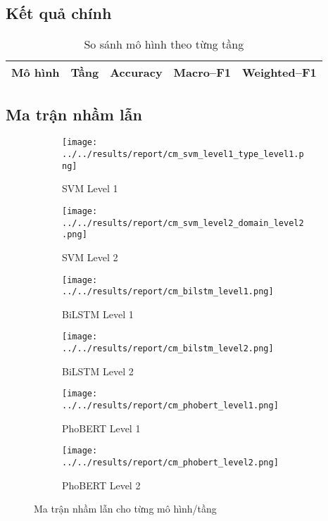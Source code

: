 \documentclass[12pt,a4paper]{article}
\begin{document}
\subsection{Kết quả chính}
\begin{table}[H]
  \centering
  \caption{So sánh mô hình theo từng tầng}
  \begin{tabular}{lllll}
    \toprule
    Mô hình & Tầng & Accuracy & Macro--F1 & Weighted--F1 \\
    \midrule
    \bottomrule
  \end{tabular}
\end{table}

\subsection{Ma trận nhầm lẫn}
\begin{figure}[H]
  \centering
  \begin{subfigure}[b]{0.49\linewidth}
    \centering
    \texttt{[image: ../../results/report/cm\_svm\_level1\_type\_level1.png]}
    \caption{SVM Level 1}
  \end{subfigure}
  \begin{subfigure}[b]{0.49\linewidth}
    \centering
    \texttt{[image: ../../results/report/cm\_svm\_level2\_domain\_level2.png]}
    \caption{SVM Level 2}
  \end{subfigure}
  \begin{subfigure}[b]{0.49\linewidth}
    \centering
    \texttt{[image: ../../results/report/cm\_bilstm\_level1.png]}
    \caption{BiLSTM Level 1}
  \end{subfigure}
  \begin{subfigure}[b]{0.49\linewidth}
    \centering
    \texttt{[image: ../../results/report/cm\_bilstm\_level2.png]}
    \caption{BiLSTM Level 2}
  \end{subfigure}
  \begin{subfigure}[b]{0.49\linewidth}
    \centering
    \texttt{[image: ../../results/report/cm\_phobert\_level1.png]}
    \caption{PhoBERT Level 1}
  \end{subfigure}
  \begin{subfigure}[b]{0.49\linewidth}
    \centering
    \texttt{[image: ../../results/report/cm\_phobert\_level2.png]}
    \caption{PhoBERT Level 2}
  \end{subfigure}
  \caption{Ma trận nhầm lẫn cho từng mô hình/tầng}
\end{figure}
\end{document}

